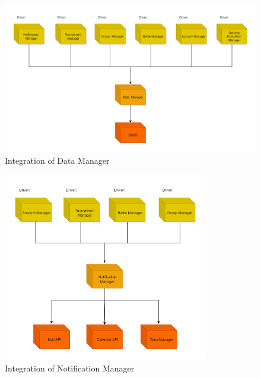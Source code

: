 \documentclass[../DD.tex]{subfiles}
\begin{document}
        \begin{figure}[h!]
            \centering
            \hspace*{-1cm}
            \includegraphics[width=1.05\textwidth]{../assets/section_5/1.png}
            \caption{Integration of Data Manager}
        \end{figure}

        \begin{figure}[H]
            \centering
            \hspace*{-1cm}
            \includegraphics[width=0.8\textwidth]{../assets/section_5/2.png}
            \caption{Integration of Notification Manager}
        \end{figure}
        \newpage
\end{document}
